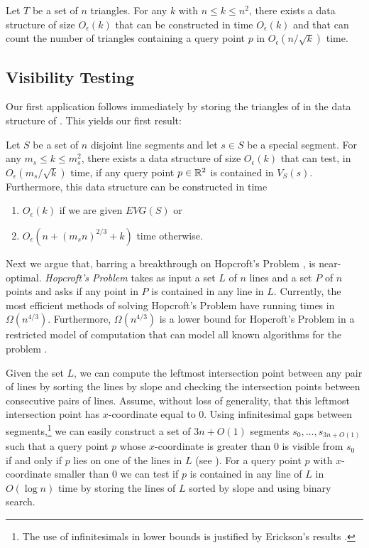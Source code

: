 \documentclass{patmorin}
\newcommand{\EVG}{\mathit{EVG}}
\newcommand{\Oe}{O_\epsilon}
\begin{document}
\begin{thm}[\cite{ae99,m92}]
Let $T$ be a set of $n$ triangles. For any $k$ with $n\le k\le n^2$, there
exists a data structure of size $\Oe(k)$ that can be constructed in time
$\Oe(k)$ and that can count the number of triangles containing a query
point $p$ in $\Oe(n/\sqrt{k})$ time.
\end{thm}


\subsection{Visibility Testing}

Our first application follows immediately by storing the triangles of
 in the data structure of .  This
yields our first result:

\begin{thm}
Let $S$ be a set of $n$ disjoint line segments and let $s\in S$
be a special segment.  For any $m_s\le k\le m_s^2$, there exists a
data structure of size $\Oe(k)$ that can test, in $\Oe(m_s/\sqrt{k})$ time,
if any query point $p\in\mathbb{R}^2$ is contained in $V_S(s)$.  Furthermore,
this data structure can be constructed in time
\begin{enumerate}
  \item $\Oe(k)$ if we are given $\EVG(S)$ or
  \item $\Oe(n + (m_sn)^{2/3} + k)$ time otherwise.
\end{enumerate}
\end{thm}


Next we argue that, barring a breakthrough on Hopcroft's Problem
\cite{e96},  is near-optimal.  \emph{Hopcroft's
Problem} takes as input a set $L$ of $n$ lines and a set $P$ of $n$ points
and asks if any point in $P$ is contained in any line in $L$. Currently,
the most efficient methods of solving Hopcroft's Problem have running
times in $\Omega(n^{4/3})$.  Furthermore, $\Omega(n^{4/3})$ is a lower
bound for Hopcroft's Problem in a restricted model of computation that
can model all known algorithms for the problem \cite{e96}.

Given the set $L$, we can compute the leftmost intersection point between
any pair of lines by sorting the lines by slope and checking the
intersection points between consecutive pairs of lines.  Assume, without
loss of generality, that this leftmost intersection point has
$x$-coordinate equal to 0. Using infinitesimal gaps between
segments,\footnote{The use of infinitesimals in lower bounds is justified
by Erickson's results \cite{e99b}.} we can easily construct a set of $3n+O(1)$
segments $s_0,\ldots,s_{3n+O(1)}$ such that a query point $p$ whose
$x$-coordinate is greater than 0 is visible from $s_0$ if and only if $p$
lies on one of the lines in $L$ (see ).  For a query point
$p$ with $x$-coordinate smaller than 0 we can test if $p$ is contained in
any line of $L$ in $O(\log n)$ time by storing the lines of $L$ sorted by
slope and using binary search.
\end{document}
